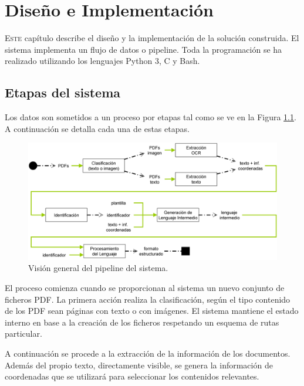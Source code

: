 
\chapter{Diseño e Implementación}
\label{chap:implemetación}

\lettrine{E}{ste} capítulo describe el diseño y la implementación de la solución construida. El sistema implementa un flujo de datos o pipeline. Toda la programación se ha realizado utilizando los lenguajes Python 3, C y Bash.

\section{Etapas del sistema}

Los datos son sometidos a un proceso por etapas tal como se ve en la Figura \ref{fig:vision-general-del-sistema}. A continuación se detalla cada una de estas etapas.

\begin{figure}[hp!]
    \centering
    \includegraphics[width=1.0\textwidth]{imaxes/h-implementacion/vision-general-del-sistema-2}
    \caption{Visión general del pipeline del sistema.}
    \label{fig:vision-general-del-sistema}
\end{figure}

El proceso comienza cuando se proporcionan al sistema un nuevo conjunto de ficheros PDF. La primera acción realiza la clasificación, según el tipo contenido de los PDF sean páginas con texto o con imágenes. El sistema mantiene el estado interno en base a la creación de los ficheros respetando un esquema de rutas particular.

A continuación se procede a la extracción de la información de los documentos. Además del propio texto, directamente visible, se genera la información de coordenadas que se utilizará para seleccionar los contenidos relevantes.


